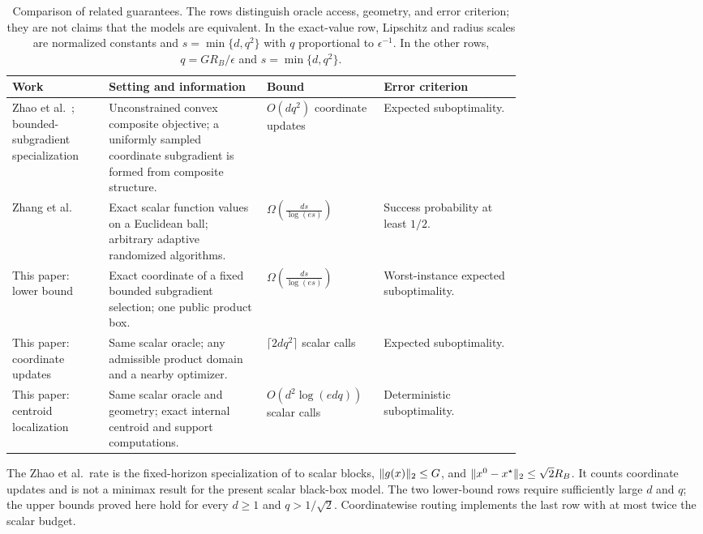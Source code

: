 \documentclass[11pt]{article}
\numberwithin{equation}{section}
\theoremstyle{definition}
\theoremstyle{remark}
\newcommand{\eps}{\epsilon}
\DeclarePairedDelimiter{\norm}{\lVert}{\rVert}
\begin{document}
\begin{table}[t]
\centering
\caption{Comparison of related guarantees. The rows distinguish oracle access, geometry, and error criterion; they are not claims that the models are equivalent. In the exact-value row, Lipschitz and radius scales are normalized constants and $s=\min\{d,q^2\}$ with $q$ proportional to $\eps^{-1}$. In the other rows, $q=GR_B/\eps$ and $s=\min\{d,q^2\}$.}
\label{tab:comparison}
\footnotesize
\setlength{\tabcolsep}{4pt}
\renewcommand{\arraystretch}{1.3}
\begin{tabularx}{\linewidth}{@{}L{0.19\linewidth}L{0.31\linewidth}L{0.23\linewidth}Y@{}}
\toprule
Work & Setting and information & Bound & Error criterion \\
\midrule
Zhao et al.\ \cite{ZhaoEtAl2023}; bounded-subgradient specialization
& Unconstrained convex composite objective; a uniformly sampled coordinate subgradient is formed from composite structure.
& $O(dq^2)$ coordinate updates
& Expected suboptimality. \\
\addlinespace[4pt]
Zhang et al.\ \cite{ZZQL2026}
& Exact scalar function values on a Euclidean ball; arbitrary adaptive randomized algorithms.
& $\displaystyle\Omega\!\left(\frac{ds}{\log(es)}\right)$
& Success probability at least $1/2$. \\
\addlinespace[4pt]
This paper: lower bound
& Exact coordinate of a fixed bounded subgradient selection; one public product box.
& $\displaystyle\Omega\!\left(\frac{ds}{\log(es)}\right)$
& Worst-instance expected suboptimality. \\
\addlinespace[4pt]
This paper: coordinate updates
& Same scalar oracle; any admissible product domain and a nearby optimizer.
& $\lceil2dq^2\rceil$ scalar calls
& Expected suboptimality. \\
\addlinespace[4pt]
This paper: centroid localization
& Same scalar oracle and geometry; exact internal centroid and support computations.
& $O(d^2\log(edq))$ scalar calls
& Deterministic suboptimality. \\
\bottomrule
\end{tabularx}

\vspace{5pt}
\parbox{\linewidth}{\footnotesize
The Zhao et al.\ rate is the fixed-horizon specialization of \cite[Lemma~3.1(b)]{ZhaoEtAl2023} to scalar blocks, $\norm{g(x)}_2\le G$, and $\norm{x^0-x^\star}_2\le\sqrt2R_B$. It counts coordinate updates and is not a minimax result for the present scalar black-box model. The two lower-bound rows require sufficiently large $d$ and $q$; the upper bounds proved here hold for every $d\ge1$ and $q>1/\sqrt2$. Coordinatewise routing implements the last row with at most twice the scalar budget.}
\end{table}
\end{document}
